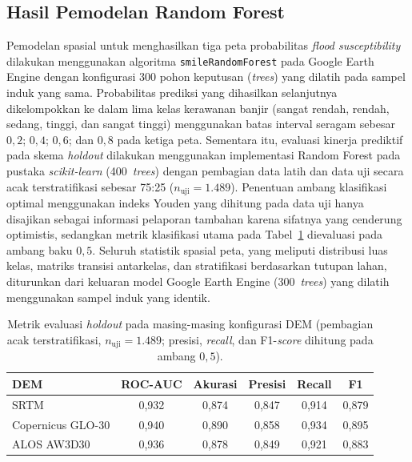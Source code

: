 \documentclass[12pt]{article}
\begin{document}
\subsection{Hasil Pemodelan Random Forest}

Pemodelan spasial untuk menghasilkan tiga peta probabilitas \textit{flood
susceptibility} dilakukan menggunakan algoritma \texttt{smileRandomForest}
pada Google Earth Engine dengan konfigurasi 300 pohon keputusan
(\textit{trees}) yang dilatih pada sampel induk yang sama. Probabilitas
prediksi yang dihasilkan selanjutnya dikelompokkan ke dalam lima kelas
kerawanan banjir (sangat rendah, rendah, sedang, tinggi, dan sangat tinggi)
menggunakan batas interval seragam sebesar $0{,}2$; $0{,}4$; $0{,}6$; dan
$0{,}8$ pada ketiga peta. Sementara itu, evaluasi kinerja prediktif pada skema
\textit{holdout} dilakukan menggunakan implementasi Random Forest pada pustaka
\textit{scikit-learn} (400~\textit{trees}) dengan pembagian data latih dan
data uji secara acak terstratifikasi sebesar 75:25 ($n_{\text{uji}}=1.489$).
Penentuan ambang klasifikasi optimal menggunakan indeks Youden
\cite{youden1950} yang dihitung pada data uji hanya disajikan sebagai
informasi pelaporan tambahan karena sifatnya yang cenderung optimistis,
sedangkan metrik klasifikasi utama pada Tabel~\ref{tab:metrik-holdout}
dievaluasi pada ambang baku $0{,}5$. Seluruh statistik spasial peta, yang
meliputi distribusi luas kelas, matriks transisi antarkelas, dan stratifikasi
berdasarkan tutupan lahan, diturunkan dari keluaran model Google Earth Engine
(300~\textit{trees}) yang dilatih menggunakan sampel induk yang identik.

\begin{table}[ht]
\centering
\caption{Metrik evaluasi \textit{holdout} pada masing-masing konfigurasi DEM (pembagian acak terstratifikasi, $n_{\text{uji}}=1.489$; presisi, \textit{recall}, dan F1-\textit{score} dihitung pada ambang $0{,}5$).}
\label{tab:metrik-holdout}
\begin{tabular}{lccccc}
\toprule
\textbf{DEM} & \textbf{ROC-AUC} & \textbf{Akurasi} & \textbf{Presisi} & \textbf{Recall} & \textbf{F1} \\
\midrule
SRTM              & 0,932 & 0,874 & 0,847 & 0,914 & 0,879 \\
Copernicus GLO-30 & 0,940 & 0,890 & 0,858 & 0,934 & 0,895 \\
ALOS AW3D30       & 0,936 & 0,878 & 0,849 & 0,921 & 0,883 \\
\bottomrule
\end{tabular}
\end{table}
\end{document}
